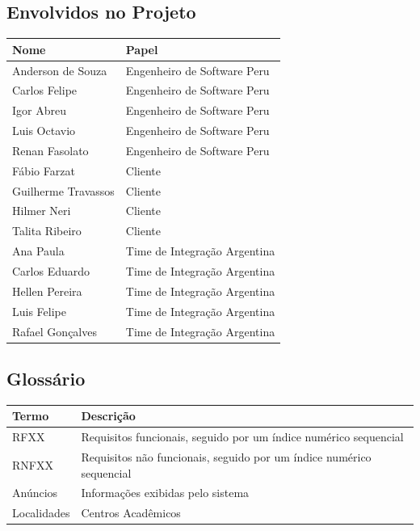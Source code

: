 \documentclass[a4paper, 12pt]{article}
\begin{document}
\subsection{Envolvidos no Projeto}
\begin{table}[ht]
	\centering

	\begin{tabular}{p{7cm}p{7cm}}
		\hline
		\cellcolor{gray}Nome&\cellcolor{gray}Papel  \\
		\hline
		Anderson de Souza&Engenheiro de Software Peru\\
		Carlos Felipe&Engenheiro de Software Peru\\
		Igor Abreu&Engenheiro de Software Peru\\
		Luis Octavio&Engenheiro de Software Peru\\
		Renan Fasolato&Engenheiro de Software Peru\\
		Fábio Farzat&Cliente\\
		Guilherme Travassos&Cliente\\
		Hilmer Neri&Cliente\\
		Talita Ribeiro&Cliente\\
		Ana Paula&Time de Integração Argentina\\
		Carlos Eduardo&Time de Integração Argentina\\
		Hellen Pereira&Time de Integração Argentina\\
		Luis Felipe&Time de Integração Argentina\\
		Rafael Gonçalves&Time de Integração Argentina\\
		\hline
	\end{tabular}
\end{table}
\subsection{Glossário}
\begin{table}[ht]
	\centering

	\begin{tabular}{p{2cm}p{12cm}}
		\hline
		\cellcolor{gray}Termo&\cellcolor{gray}Descrição  \\
		\hline
		RFXX&Requisitos funcionais, seguido por um índice numérico sequencial\\
		RNFXX&Requisitos não funcionais, seguido por um índice numérico sequencial\\
        An\'{u}ncios&Informa\c{c}\~{o}es exibidas pelo sistema\\
        Localidades&Centros Acad\^{e}micos\\
		\hline
	\end{tabular}
\end{table}
\end{document}
